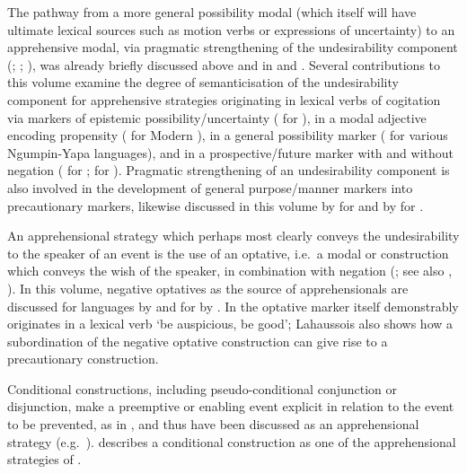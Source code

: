 \documentclass[output=paper,colorlinks,citecolor=brown]{langscibook}
\begin{document}
The pathway from a more general possibility modal (which itself will have ultimate lexical sources such as motion verbs or expressions of uncertainty) to an apprehensive modal, via pragmatic strengthening of the undesirability component (\cite[211]{bybeeetal1994}; \cite[34--36]{Dobrushina2006}; \cite{pakendorfschalley2007}), was already briefly discussed above and in  and . Several contributions to this volume examine the degree of semanticisation of the undesirability component for apprehensive strategies originating in lexical verbs of cogitation via markers of epistemic possibility\slash uncertainty (\citeauthor{chapters/rhee-kuteva} for ), in a modal adjective encoding propensity (\citeauthor{chapters/francez} for Modern ), in a general possibility marker (\citeauthor{chapters/browne} for various Ngumpin\hyp Yapa languages), and in a prospective\slash future marker with and without negation (\citeauthor{chapters/fedotov} for ; \citeauthor{chapters/song} for ). Pragmatic strengthening of an undesirability component is also involved in the development of general purpose/manner markers into precautionary markers, likewise discussed in this volume by \citeauthor{chapters/rhee-kuteva} for  and by \citeauthor{chapters/treis} for .


An apprehensional strategy which perhaps most clearly conveys the undesirability to the speaker of an event is the use of an optative, i.e.\ a modal or construction which conveys the wish of the speaker, in combination with negation (\cite{Dobrushina2006}; see also , ). In this volume, negative optatives  as the source of apprehensionals are discussed for  languages by \citeauthor{chapters/wiemer} and for  by \citeauthor{chapters/lahaussois}. In  the optative marker itself demonstrably originates in a lexical verb `be auspicious, be good'; Lahaussois also shows how a subordination of the negative optative construction can give rise to a precautionary construction.

\largerpage
Conditional constructions, including pseudo-conditional conjunction or disjunction, make a preemptive or enabling event explicit in relation to the event to be prevented, as in , and thus have been discussed as an apprehensional strategy (e.g.\ \cites{auwera1986}{dominicyfranken2002}[35--40]{narrog2012}{clancyetal1997}{knoob2008}). \citet{chapters/lahaussois}  describes a conditional construction as one of the apprehensional strategies of . 
\end{document}
